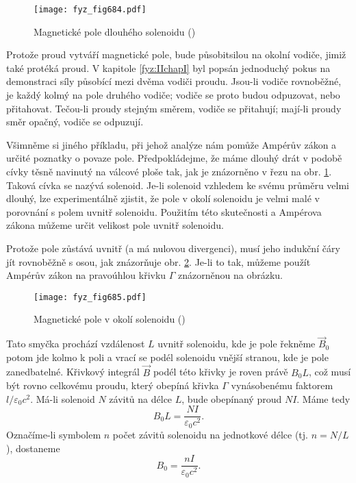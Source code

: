     \begin{figure}[ht!] %
      \centering
      \texttt{[image: fyz\_fig684.pdf]}
      \caption{Magnetické pole dlouhého solenoidu
               (\cite[s.~707]{Feynman02})}
      \label{fyz:fig684}
    \end{figure}

    Protože proud vytváří magnetické pole, bude působitsilou na okolní vodiče, jimiž také protéká
    proud. V kapitole \ref{fyz:IIchapI} byl popsán jednoduchý pokus na demonstraci síly působící
    mezi dvěma vodiči proudu. Jsou-li vodiče rovnoběžné, je každý kolmý na pole druhého vodiče;
    vodiče se proto budou odpuzovat, nebo přitahovat. Tečou-li proudy stejným směrem, vodiče se
    přitahují; mají-li proudy směr opačný, vodiče se odpuzují.

    Všimněme si jiného příkladu, při jehož analýze nám pomůže Ampérův zákon a určité poznatky o
    povaze pole. Předpokládejme, že máme dlouhý drát v podobě cívky těsně navinutý na válcové ploše
    tak, jak je znázorněno v řezu na obr. \ref{fyz:fig684}. Taková cívka se nazývá solenoid. Je-li
    solenoid vzhledem ke svému průměru velmi dlouhý, lze experimentálně zjistit, že pole v okolí
    solenoidu je velmi malé v porovnání s polem uvnitř solenoidu. Použitím této skutečnosti a
    Ampérova zákona můžeme určit velikost pole uvnitř solenoidu.

    Protože pole zůstává uvnitř (a má nulovou divergenci), musí jeho indukční čáry jít rovnoběžně s
    osou, jak znázorňuje obr. \ref{fyz:fig685}. Je-li to tak, můžeme použít Ampérův zákon na
    pravoúhlou křivku \(\Gamma\) znázorněnou na obrázku.

    \begin{figure}[ht!] %
      \centering
      \texttt{[image: fyz\_fig685.pdf]}
      \caption{Magnetické pole v okolí solenoidu
               (\cite[s.~707]{Feynman02})}
      \label{fyz:fig685}
    \end{figure}

    Tato smyčka prochází vzdálenost \(L\) uvnitř solenoidu, kde je pole řekněme \(\vec{B}_0\) potom
    jde kolmo k poli a vrací se podél solenoidu vnější stranou, kde je pole zanedbatelné. Křivkový
    integrál \(\vec{B}\) podél této křivky je roven právě \(B_0L\), což musí být rovno celkovému
    proudu, který obepíná křivka \(\Gamma\) vynásobenému faktorem \(l/\varepsilon_0c^2\). Má-li
    solenoid \(N\) závitů na délce \(L\), bude obepínaný proud \(NI\). Máme tedy
    \begin{equation*}
      B_0L = \dfrac{NI}{\varepsilon_0c^2}.
    \end{equation*}
    Označíme-li symbolem \(n\) počet závitů solenoidu na jednotkové délce (tj. \(n = N/L\)),
    dostaneme
    \begin{equation}\label{fyz:eq806}
      B_0 = \dfrac{nI}{\varepsilon_0c^2}.
    \end{equation}

